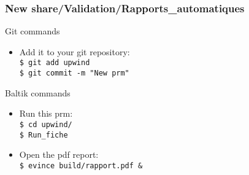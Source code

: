 \documentclass[10pt, hyperref={unicode=true,pdfusetitle, bookmarks=true,bookmarksnumbered=false,bookmarksopen=false, breaklinks=false,pdfborder={0 0 1},backref=true,colorlinks=true,linkcolor=darkblue,pageanchor, urlcolor=darkblue}]{beamer}
\begin{document}
\begin{frame}
\frametitle{New share/Validation/Rapports\_automatiques}

\begin{alertblock}{Git commands}
\begin{itemize}
\item Add it to your git repository:\\
\texttt{\$ git add upwind}\\
\texttt{\$ git commit -m "New prm"}
\end{itemize}
\end{alertblock}

\begin{block}{Baltik commands}
\begin{itemize}
\item Run this prm:\\
\texttt{\$ cd upwind/}\\
\texttt{\$ Run\_fiche}\\
\item Open the pdf report:\\
\texttt{\$ evince build/rapport.pdf \&}\\
\end{itemize}
\end{block}
\end{frame}
\end{document}
